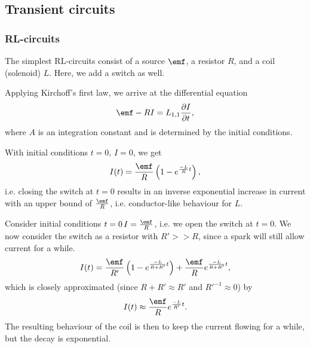 \subsection{Transient circuits}
    \subsubsection{RL-circuits}
        The simplest RL-circuits consist of a source $\emf$, a resistor $R$, and a coil (solenoid) $L$.
        Here, we add a switch as well.

        Applying Kirchoff's first law, we arrive at the differential equation
        \begin{equation}
            \emf - RI = L_{1,1}\frac{\partial I}{\partial t},
        \end{equation}
        where $A$ is an integration constant and is determined by the initial conditions.

        With initial conditions $t=0,\, I=0$, we get 
        \begin{equation}
            I(t) = \frac{\emf}{R}\left(1-e^{\frac{-L}{R}t}\right),
        \end{equation}
        i.e. closing the switch at $t=0$ results in an inverse exponential increase in current 
        with an upper bound of $\frac{\emf}{R}$, i.e. conductor-like behaviour for $L$.

        Consider initial conditions $t=0\, I = \frac{\emf}{R}$, i.e. we open the switch at $t=0$.
        We now consider the switch as a resistor with $R' >> R$, since a spark will still allow current for a while.
        \begin{equation}
            I(t) = \frac{\emf}{R'}\left(1-e^{\frac{-L}{R+R'}t}\right) + \frac{\emf}{R} e^{\frac{-L}{R+R'}t},
        \end{equation}
        which is closely approximated (since $R+R' \approx R'$ and $R'^{-1} \approx 0$) by
        \begin{equation}
            I(t) \approx \frac{\emf}{R}e^{\frac{-L}{R'}t}.
        \end{equation}
        The resulting behaviour of the coil is then to keep the current flowing for a while, but the decay is exponential.

